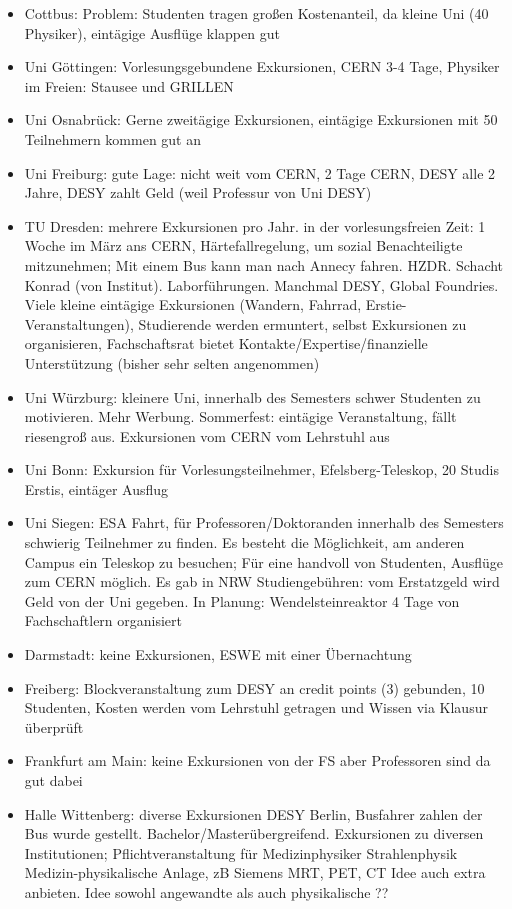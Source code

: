 \begin{itemize}
        \item Cottbus: Problem: Studenten tragen großen Kostenanteil, da kleine Uni (40 Physiker), eintägige Ausflüge klappen gut
        \item Uni Göttingen:
        Vorlesungsgebundene Exkursionen, CERN 3-4 Tage, Physiker im Freien: Stausee und GRILLEN
        \item Uni Osnabrück:
        Gerne zweitägige Exkursionen, eintägige Exkursionen mit 50 Teilnehmern kommen gut an
        \item Uni Freiburg:
        gute Lage: nicht weit vom CERN, 2 Tage CERN, DESY alle 2 Jahre, DESY zahlt Geld (weil Professur von Uni DESY)
        \item TU Dresden:
        mehrere Exkursionen pro Jahr. in der vorlesungsfreien Zeit: 1 Woche im März ans CERN, Härtefallregelung, um sozial Benachteiligte mitzunehmen; Mit einem Bus kann man nach Annecy fahren. HZDR. Schacht Konrad (von Institut). Laborführungen. Manchmal DESY, Global Foundries. Viele kleine eintägige Exkursionen (Wandern, Fahrrad, Erstie-Veranstaltungen), Studierende werden ermuntert, selbst Exkursionen zu organisieren, Fachschaftsrat bietet Kontakte/Expertise/finanzielle Unterstützung
        (bisher sehr selten angenommen)
        \item Uni Würzburg:
        kleinere Uni, innerhalb des Semesters schwer Studenten zu motivieren. Mehr Werbung. Sommerfest: eintägige Veranstaltung, fällt riesengroß aus. Exkursionen vom CERN vom Lehrstuhl aus
        \item Uni Bonn:
        Exkursion für Vorlesungsteilnehmer, Efelsberg-Teleskop, 20 Studis Erstis, eintäger Ausflug
        \item Uni Siegen:
        ESA Fahrt, für Professoren/Doktoranden innerhalb des Semesters schwierig Teilnehmer zu finden. Es besteht die Möglichkeit, am anderen Campus ein Teleskop zu besuchen; Für eine handvoll von Studenten, Ausflüge zum CERN möglich. Es gab in NRW Studiengebühren: vom Erstatzgeld wird Geld von der Uni gegeben. In Planung: Wendelsteinreaktor 4 Tage von Fachschaftlern organisiert
        \item Darmstadt:
        keine Exkursionen, ESWE mit einer Übernachtung
        \item Freiberg:
        Blockveranstaltung zum DESY an credit points (3) gebunden, 10 Studenten, Kosten werden vom Lehrstuhl getragen und Wissen via Klausur überprüft
        \item Frankfurt am Main:
        keine Exkursionen von der FS aber Professoren sind da gut dabei
        \item Halle Wittenberg:
        diverse Exkursionen DESY Berlin, Busfahrer zahlen der Bus wurde gestellt. Bachelor/Masterübergreifend. Exkursionen zu diversen Institutionen; Pflichtveranstaltung für Medizinphysiker Strahlenphysik Medizin-physikalische Anlage, zB Siemens MRT, PET, CT Idee auch extra anbieten. Idee sowohl angewandte als auch physikalische ??
      \end{itemize}

